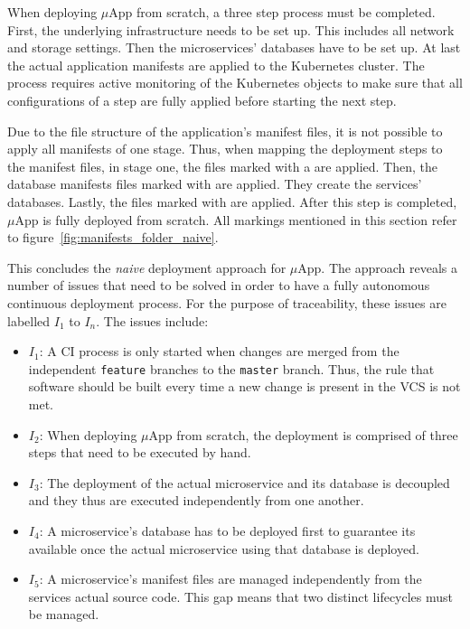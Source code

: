 When deploying $\mu$App from scratch, a three step process must be completed.
First, the underlying infrastructure needs to be set up. This includes all
network and storage settings. Then the microservices' databases have to be set
up. At last the actual application manifests are applied to the Kubernetes
cluster. The process requires active monitoring of the Kubernetes objects to
make sure that all configurations of a step are fully applied before starting
the next step.

Due to the file structure of the application's manifest files, it is not
possible to apply all manifests of one stage. Thus, when mapping the deployment
steps to the manifest files, in stage one, the files marked with a
\inlineDiamond{} are applied. Then, the database manifests files marked with
\inlineRectangle{} are applied. They create the services' databases.
Lastly, the files marked with \inlineTriangle{} are applied. After this step is
completed, $\mu$App is fully deployed from scratch. All markings mentioned in
this section refer to figure~\ref{fig:manifests_folder_naive}.

This concludes the \textit{naive} deployment approach for $\mu$App. The
approach reveals a number of issues that need to be solved in order to have a
fully autonomous continuous deployment process. For the purpose of
traceability, these issues are labelled $I_1$ to $I_n$. The issues include:

\begin{itemize}
  \item \textit{$I_1$}: A \ac{CI} process is only started when changes are
    merged from the independent \texttt{feature} branches to the
    \texttt{master} branch. Thus, the rule that software should be built every
    time a new change is present in the \ac{VCS} is not met.
  \item \textit{$I_2$}: When deploying $\mu$App from scratch, the deployment is
    comprised of three steps that need to be executed by hand.
  \item \textit{$I_3$}: The deployment of the actual microservice and its
    database is decoupled and they thus are executed independently from one
    another.
  \item \textit{$I_4$}: A microservice's database has to be deployed first to
    guarantee its available once the actual microservice using that database is
    deployed.
  \item \textit{$I_5$}: A microservice's manifest files are managed
    independently from the services actual source code. This gap means that two
    distinct lifecycles must be managed.
\end{itemize}


